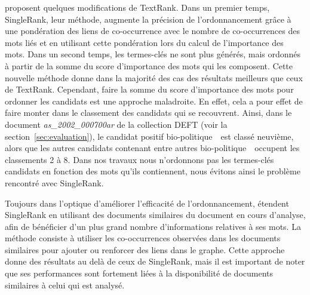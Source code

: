      proposent quelques modifications de TextRank.
    Dans un premier temps, SingleRank, leur méthode, augmente la précision de
    l'ordonnancement grâce à une pondération des liens de co-occurrence avec le
    nombre de co-occurrences des mots liés et en utilisant cette pondération
    lors du calcul de l'importance des mots.
    Dans un second temps, les termes-clés ne sont plus générés, mais ordonnés à
    partir de la somme du score d'importance des mots qui les composent. Cette
    nouvelle méthode donne dans la majorité des cas des résultats meilleurs que
    ceux de TextRank. Cependant, faire la somme du score d'importance des
    mots pour ordonner les candidats est une approche maladroite. En effet, cela
    a pour effet de faire monter dans le classement des candidats qui se
    recouvrent. Ainsi, dans le document \textit{as\_2002\_000700ar} de la
    collection DEFT (voir la section~\ref{sec:evaluation}), le candidat positif
    \og bio-politique~\fg\ est classé neuvième, alors que les autres candidats
    contenant entre autres \og bio-politique~\fg\ occupent les classements 2 à
    8. Dans nos travaux nous n'ordonnons pas les termes-clés candidats en
    fonction des mots qu'ils contiennent, nous évitons ainsi le problème
    rencontré avec SingleRank.

    Toujours dans l'optique d'améliorer l'efficacité de l'ordonnancement,
     étendent SingleRank en utilisant des documents
    similaires du document en cours d'analyse, afin de bénéficier d'un plus
    grand nombre d'informations relatives à ses mots. La méthode consiste à
    utiliser les co-occurrences observées dans les documents similaires pour
    ajouter ou renforcer des liens dans le graphe. Cette approche donne des
    résultats au delà de ceux de SingleRank, mais il est important de noter que
    ses performances sont fortement liées à la disponibilité de documents
    similaires à celui qui est analysé.

